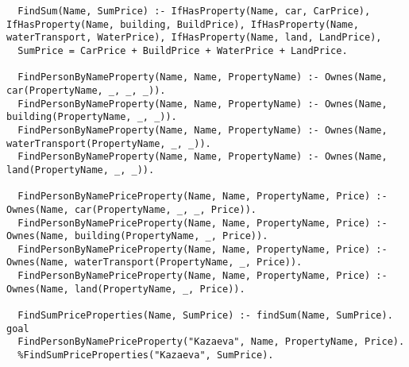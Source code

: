 \begin{lstlisting}
  FindSum(Name, SumPrice) :- IfHasProperty(Name, car, CarPrice), IfHasProperty(Name, building, BuildPrice), IfHasProperty(Name, waterTransport, WaterPrice), IfHasProperty(Name, land, LandPrice),
  SumPrice = CarPrice + BuildPrice + WaterPrice + LandPrice.

  FindPersonByNameProperty(Name, Name, PropertyName) :- Ownes(Name, car(PropertyName, _, _, _)).
  FindPersonByNameProperty(Name, Name, PropertyName) :- Ownes(Name, building(PropertyName, _, _)).
  FindPersonByNameProperty(Name, Name, PropertyName) :- Ownes(Name, waterTransport(PropertyName, _, _)).
  FindPersonByNameProperty(Name, Name, PropertyName) :- Ownes(Name, land(PropertyName, _, _)).

  FindPersonByNamePriceProperty(Name, Name, PropertyName, Price) :- Ownes(Name, car(PropertyName, _, _, Price)).
  FindPersonByNamePriceProperty(Name, Name, PropertyName, Price) :- Ownes(Name, building(PropertyName, _, Price)).
  FindPersonByNamePriceProperty(Name, Name, PropertyName, Price) :- Ownes(Name, waterTransport(PropertyName, _, Price)).
  FindPersonByNamePriceProperty(Name, Name, PropertyName, Price) :- Ownes(Name, land(PropertyName, _, Price)).

  FindSumPriceProperties(Name, SumPrice) :- findSum(Name, SumPrice).	
goal
  FindPersonByNamePriceProperty("Kazaeva", Name, PropertyName, Price).
  %FindSumPriceProperties("Kazaeva", SumPrice).
\end{lstlisting}

